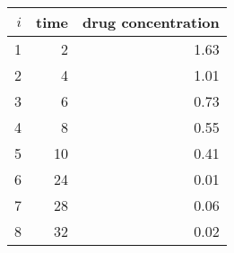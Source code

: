 \begin{tabular}{rrr}
\toprule
 $i$ &  time &  drug concentration \\
\midrule
   1 &     2 &                1.63 \\
   2 &     4 &                1.01 \\
   3 &     6 &                0.73 \\
   4 &     8 &                0.55 \\
   5 &    10 &                0.41 \\
   6 &    24 &                0.01 \\
   7 &    28 &                0.06 \\
   8 &    32 &                0.02 \\
\bottomrule
\end{tabular}
